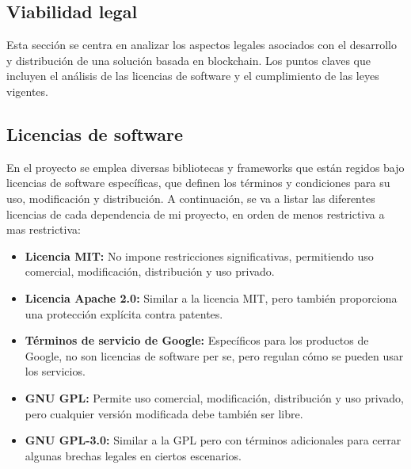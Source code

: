 \subsection{Viabilidad legal}

Esta sección se centra en analizar los aspectos legales asociados con el desarrollo y distribución de una solución basada en blockchain.
Los puntos claves que incluyen el análisis de las licencias de software y el cumplimiento de las leyes vigentes.

\subsection{Licencias de software}

En el proyecto se emplea diversas bibliotecas y frameworks que están regidos bajo licencias de software específicas, que definen los términos y condiciones para su uso, modificación y distribución.
A continuación, se va a listar las diferentes licencias de cada dependencia de mi proyecto, en orden de menos restrictiva a mas restrictiva:

\begin{itemize}

\item \textbf{Licencia MIT:} No impone restricciones significativas, permitiendo uso comercial, modificación, distribución y uso privado.

\item \textbf{Licencia Apache 2.0:} Similar a la licencia MIT, pero también proporciona una protección explícita contra patentes.

\item \textbf{Términos de servicio de Google:} Específicos para los productos de Google, no son licencias de software per se, pero regulan cómo se pueden usar los servicios.

\item \textbf{GNU GPL:} Permite uso comercial, modificación, distribución y uso privado, pero cualquier versión modificada debe también ser libre.

\item \textbf{GNU GPL-3.0:} Similar a la GPL pero con términos adicionales para cerrar algunas brechas legales en ciertos escenarios.

\end{itemize}


